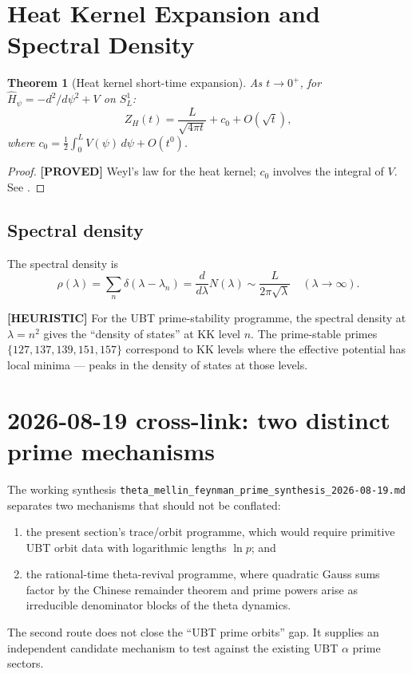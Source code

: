 \documentclass[11pt,a4paper]{article}
\newtheorem{theorem}{Theorem}
\newcommand{\proved}[1]{\textbf{[PROVED]} #1}
\newcommand{\heuristic}[1]{\textbf{[HEURISTIC]} #1}
\begin{document}
\section{Heat Kernel Expansion and Spectral Density}

\begin{theorem}[Heat kernel short-time expansion]
  As $t \to 0^+$, for $\hat{H}_\psi = -d^2/d\psi^2 + V$ on $S^1_L$:
  \[
    Z_H(t) = \frac{L}{\sqrt{4\pi t}} + c_0 + O(\sqrt{t}),
  \]
  where $c_0 = \frac{1}{2}\int_0^L V(\psi)\, d\psi + O(t^0)$.
\end{theorem}

\begin{proof}
  \proved{Weyl's law for the heat kernel; $c_0$ involves the integral of $V$.
  See \cite[Thm.\ 4.2]{Gilkey}.}
\end{proof}

\subsection{Spectral density}

The spectral density is
\[
  \rho(\lambda) = \sum_n \delta(\lambda - \lambda_n)
  = \frac{d}{d\lambda}N(\lambda) \sim \frac{L}{2\pi\sqrt{\lambda}} \quad (\lambda \to \infty).
\]

\heuristic{For the UBT prime-stability programme, the spectral density at
$\lambda = n^2$ gives the ``density of states'' at KK level $n$.  The
prime-stable primes $\{127, 137, 139, 151, 157\}$ correspond to KK levels
where the effective potential has local minima — peaks in the density of
states at those levels.}

\section{2026-08-19 cross-link: two distinct prime mechanisms}

The working synthesis
\texttt{theta\_mellin\_feynman\_prime\_synthesis\_2026-08-19.md}
separates two mechanisms that should not be conflated:
\begin{enumerate}
  \item the present section's trace/orbit programme, which would require primitive
        UBT orbit data with logarithmic lengths $\ln p$; and
  \item the rational-time theta-revival programme, where quadratic Gauss sums factor
        by the Chinese remainder theorem and prime powers arise as irreducible
        denominator blocks of the theta dynamics.
\end{enumerate}
The second route does not close the ``UBT prime orbits'' gap.  It supplies an independent
candidate mechanism to test against the existing UBT $\alpha$ prime sectors.
\end{document}
